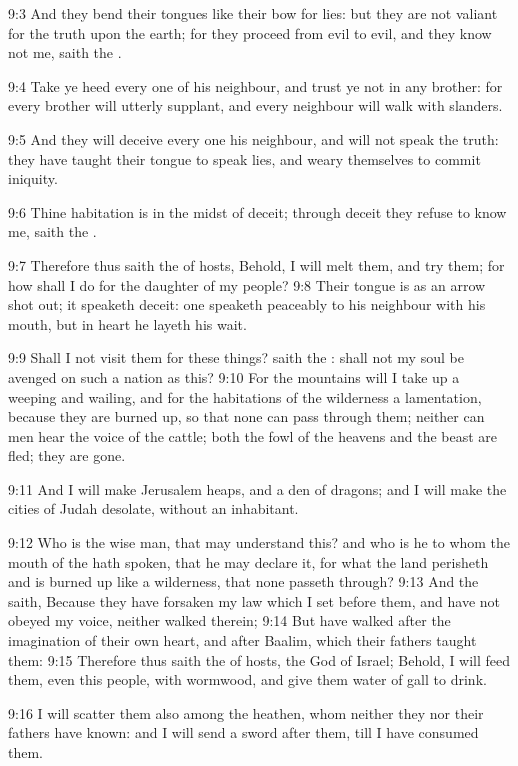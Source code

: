 9:3 And they bend their tongues like their bow for lies: but they are not valiant for the truth upon the earth; for they proceed from evil to evil, and they know not me, saith the \LORD.

9:4 Take ye heed every one of his neighbour, and trust ye not in any brother: for every brother will utterly supplant, and every neighbour will walk with slanders.

9:5 And they will deceive every one his neighbour, and will not speak the truth: they have taught their tongue to speak lies, and weary themselves to commit iniquity.

9:6 Thine habitation is in the midst of deceit; through deceit they refuse to know me, saith the \LORD.

9:7 Therefore thus saith the \LORD of hosts, Behold, I will melt them, and try them; for how shall I do for the daughter of my people?  9:8 Their tongue is as an arrow shot out; it speaketh deceit: one speaketh peaceably to his neighbour with his mouth, but in heart he layeth his wait.

9:9 Shall I not visit them for these things? saith the \LORD: shall not my soul be avenged on such a nation as this?  9:10 For the mountains will I take up a weeping and wailing, and for the habitations of the wilderness a lamentation, because they are burned up, so that none can pass through them; neither can men hear the voice of the cattle; both the fowl of the heavens and the beast are fled; they are gone.

9:11 And I will make Jerusalem heaps, and a den of dragons; and I will make the cities of Judah desolate, without an inhabitant.

9:12 Who is the wise man, that may understand this? and who is he to whom the mouth of the \LORD hath spoken, that he may declare it, for what the land perisheth and is burned up like a wilderness, that none passeth through?  9:13 And the \LORD saith, Because they have forsaken my law which I set before them, and have not obeyed my voice, neither walked therein; 9:14 But have walked after the imagination of their own heart, and after Baalim, which their fathers taught them: 9:15 Therefore thus saith the \LORD of hosts, the God of Israel; Behold, I will feed them, even this people, with wormwood, and give them water of gall to drink.

9:16 I will scatter them also among the heathen, whom neither they nor their fathers have known: and I will send a sword after them, till I have consumed them.

